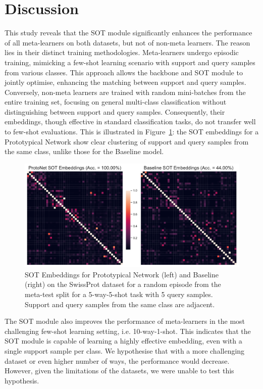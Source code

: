 \section{Discussion}

This study reveals that the SOT module significantly enhances the performance of all meta-learners on both datasets, but not of non-meta learners. The reason lies in their distinct training methodologies. Meta-learners undergo episodic training, mimicking a few-shot learning scenario with support and query samples from various classes. This approach allows the backbone and SOT module to jointly optimise, enhancing the matching between support and query samples. Conversely, non-meta learners are trained with random mini-batches from the entire training set, focusing on general multi-class classification without distinguishing between support and query samples. Consequently, their embeddings, though effective in standard classification tasks, do not transfer well to few-shot evaluations. This is illustrated in Figure~\ref{fig:sot-embeddings}: the SOT embeddings for a Prototypical Network show clear clustering of support and query samples from the same class, unlike those for the Baseline model.

\begin{figure}[h!]
    \centering
    \includegraphics[width=1\columnwidth]{../figures/sot-embeddings.pdf}
    \caption{SOT Embeddings for Prototypical Network (left) and Baseline (right) on the SwissProt dataset for a random episode from the meta-test split for a 5-way-5-shot task with 5 query samples. Support and query samples from the same class are adjacent.}
    \label{fig:sot-embeddings}
\end{figure}

The SOT module also improves the performance of meta-learners in the most challenging few-shot learning setting, i.e. 10-way-1-shot. This indicates that the SOT module is capable of learning a highly effective embedding, even with a single support sample per class. We hypothesise that with a more challenging dataset or even higher number of ways, the performance would decrease. However, given the limitations of the datasets, we were unable to test this hypothesis.

